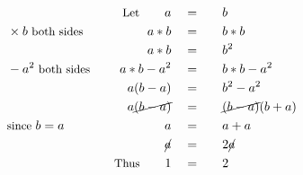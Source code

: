 \begin{alignat*}{5}
&\,&\small\text{Let}\normalsize\qquad a\quad&=\quad&&b\\
&\times b\small\text{ both sides}\quad&a*b\quad&=&&b*b\\
&\,&a*b\quad&=&&b^2\\
&-a^2\small\text{ both sides}\quad&a*b-a^2\quad&=&&b*b-a^2\\
&\,&a(b-a)\quad&=&&b^2-a^2\\
&\,&a\cancel{(b-a)}\quad&=&&\cancel{(b-a)}(b+a)\\
&\small\text{since }b=a&a\quad&=&&a+a\\
&\,&\cancel{a}\quad&=&&2\cancel{a}\\
&\,&\small\text{Thus}\normalsize\qquad1\quad&=&&2
\end{alignat*}
